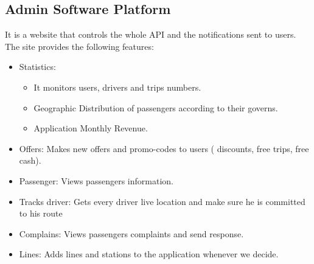 \subsection{Admin Software Platform}
\hspace{2cm} It is a website that controls the whole API and the 
notifications sent to users. The site provides the following features:
\begin{itemize}
    \item Statistics: 
    \begin{itemize}
        \item It monitors users, drivers and trips numbers.
        \item Geographic Distribution of passengers according to their governs.
        \item Application Monthly Revenue.
    \end{itemize}
    \item Offers: 
    \newline Makes new offers and promo-codes to users ( discounts, free trips, free cash).
    \item Passenger: 
    \newline Views passengers information.
    \item Tracks driver: 
    \newline Gets every driver live location and make sure he is committed to his route
    \item Complains: 
    \newline Views passengers complaints and send response.
    \item Lines: 
    \newline Adds lines and stations to the application whenever we decide.
\end{itemize}

